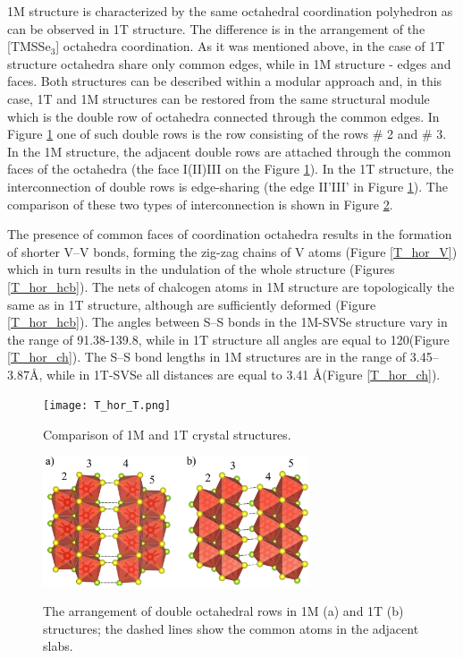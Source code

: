\documentclass[a4paperm]{article}
\begin{document}
1M structure is characterized by the same octahedral coordination polyhedron as can be observed in 1T structure.
The difference is in the arrangement of the [TMSSe$_3$] octahedra coordination.
As it was mentioned above, in the case of 1T structure octahedra share only common edges, while in 1M structure - edges and faces.
Both structures can be described within a modular approach and, in this case, 1T and 1M structures can be restored from the same structural module which is the double row of octahedra connected through the common edges.
In Figure \ref{T_hor_T} one of such double rows is the row consisting of the rows \# 2 and \# 3.
In the 1M structure, the adjacent double rows are attached through the common faces of the octahedra (the face I(II)III on the Figure \ref{T_hor_T}).
In the 1T structure, the interconnection of double rows is edge-sharing (the edge II'III' in Figure \ref{T_hor_T}). 
The comparison of these two types of interconnection is shown in Figure \ref{T_hor_slabs}.


The presence of common faces of coordination octahedra results in the formation of shorter V--V bonds, forming the zig-zag chains of V atoms (Figure \ref{T_hor_V}) which in turn results in the undulation of the whole structure (Figures \ref{T_hor_hcb}).
The nets of chalcogen atoms in 1M structure are topologically the same as in 1T structure, although are sufficiently deformed (Figure \ref{T_hor_hcb}).
The angles between S--S bonds in the 1M-SVSe structure vary in the range of 91.38-139.8\textdegree, while in 1T structure all angles are equal to 120\textdegree (Figure \ref{T_hor_ch}).
The S--S bond lengths in 1M structures are in the range of 3.45--3.87\AA, while in 1T-SVSe all distances are equal to 3.41 \AA (Figure \ref{T_hor_ch}).


\begin{figure}[H]
	\texttt{[image: T\_hor\_T.png]} \\
	\caption{Comparison of 1M and 1T crystal structures.}
	\label{T_hor_T}
\end{figure}

\begin{figure}[H]
	\includegraphics[width=0.7\textwidth]{T_hor_slabs.png} \\
	\caption{The arrangement of double octahedral rows in 1M (a) and 1T (b) structures; the dashed lines show the common atoms in the adjacent slabs.}
	\label{T_hor_slabs}
\end{figure}
\end{document}
